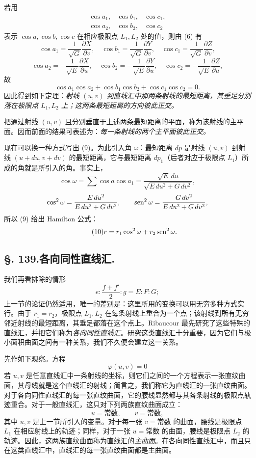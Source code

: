 若用
\[
\begin{matrix}
\cos a_1,&\cos b_1,&\cos c_1,\\
\cos a_2,&\cos b_2,&\cos c_2
\end{matrix}
\]
表示 \(\cos a,\cos b,\cos c\) 在相应极限点 \(L_1,L_2\) 处的值，则由 (6) 有
\[
 \cos a_1=\frac1{\sqrt G}\frac{\partial X}{\partial v},\quad
 \cos b_1=\frac1{\sqrt G}\frac{\partial Y}{\partial v},\quad
 \cos c_1=\frac1{\sqrt G}\frac{\partial Z}{\partial v},
\]
\[
 \cos a_2=-\frac1{\sqrt E}\frac{\partial X}{\partial u},\quad
 \cos b_2=-\frac1{\sqrt E}\frac{\partial Y}{\partial u},\quad
 \cos c_2=-\frac1{\sqrt E}\frac{\partial Z}{\partial u},
\]
故
\[
 \cos a_1\cos a_2+\cos b_1\cos b_2+\cos c_1\cos c_2=0.
\]
因此得到如下定理：\emph{射线 \((u,v)\) 到直线汇中那两条射线的最短距离，其垂足分别落在极限点 \(L_1,L_2\) 上；这两条最短距离的方向彼此正交。}

把通过射线 \((u,v)\) 且分别垂直于上述两条最短距离的平面，称为该射线的主平面。因而前面的结果可表述为：\emph{每一条射线的两个主平面彼此正交。}

现在可以换一种方式写出 (9)。为此引入角 \(\omega\)：最短距离 \(dp\) 是射线 \((u,v)\) 到射线 \((u+du,v+dv)\) 的最短距离，它与最短距离 \(dp_1\)（后者对应于极限点 \(L_1\)）所成的角就是所引入的角。事实上，
\[
 \cos\omega=\sum\cos a\cos a_1=\frac{\sqrt E\,du}{\sqrt{E\,du^2+G\,dv^2}},
\]
\[
 \cos^2\omega=\frac{E\,du^2}{E\,du^2+G\,dv^2},
 \qquad
 \operatorname{sen}^2\omega=\frac{G\,dv^2}{E\,du^2+G\,dv^2},
\]
所以 (9) 给出 Hamilton 公式：
\begin{equation}\tag{10}
 r=r_1\cos^2\omega+r_2\operatorname{sen}^2\omega.
\end{equation}

\subsection*{\S. 139.\quad 各向同性直线汇.}

我们再看排除的情形
\[
 e:\frac{f+f'}2:g=E:F:G;
\]
上一节的论证仍然适用，唯一的差别是：这里所用的变换可以用无穷多种方式实行。由于 \(r_1=r_2\)，极限点 \(L_1,L_2\) 在每条射线上重合为一个点；该射线到所有无穷邻近射线的最短距离，其垂足都落在这个点上。Ribaucour 最先研究了这些特殊的直线汇，并把它们称为\emph{各向同性直线汇}。研究这类直线汇十分重要，因为它们与极小面积曲面之间有一种关系，我们不久便会建立这一关系。

先作如下观察。方程
\[
 \varphi(u,v)=0
\]
若 \(u,v\) 是任意直线汇中一条射线的坐标，则它们之间的一个方程表示一张直纹曲面，其母线就是这个直线汇的射线；简言之，我们称它为直线汇的一张直纹曲面。对于各向同性直线汇的每一张直纹曲面，它的腰线显然都与其各条射线的极限点轨迹重合。对于一般直线汇，这只对下列两族直纹曲面成立：
\[
 u=\text{常数},\qquad v=\text{常数},
\]
其中 \(u,v\) 是上一节所引入的变量。对于每一张 \(v=\text{常数}\) 的曲面，腰线是极限点 \(L_1\) 在相应射线上的轨迹；同样，对于一张 \(u=\text{常数}\) 的曲面，腰线是极限点 \(L_2\) 的轨迹。因此，这两族直纹曲面称为直线汇的\emph{主曲面}。在各向同性直线汇中，而且只在这类直线汇中，直线汇的每一张直纹曲面都是主曲面。

